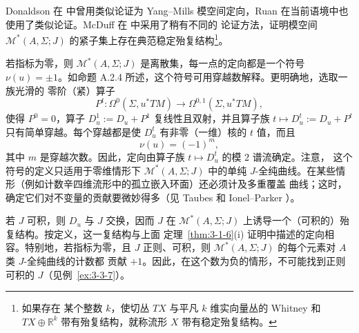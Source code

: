 \begin{remark}\label{rem:3-2-4}
Donaldson 在  中曾用类似论证为 Yang--Mills 模空间定向，Ruan
 在当前语境中也使用了类似论证。McDuff 在  中采用了稍有不同的
论证方法，证明模空间 $\mathcal M^*(A,\Sigma;J)$ 的紧子集上存在典范稳定殆复结构\footnote{如果存在
某个整数 $k$，使切丛 $TX$ 与平凡 $k$ 维实向量丛的 Whitney 和
$TX\oplus\mathbb R^k$ 带有殆复结构，就称流形 $X$ 带有稳定殆复结构。}。
\end{remark}

\begin{remark}\label{rem:3-2-5}
若指标为零，则 $\mathcal M^*(A,\Sigma;J)$ 是离散集，每一点的定向都是一个符号
$\nu(u)=\pm1$。如命题 A.2.4 所述，这个符号可用穿越数解释。更明确地，选取一族光滑的
零阶（紧）算子
\[
  P^t:\Omega^0(\Sigma,u^*TM)
  \longrightarrow\Omega^{0,1}(\Sigma,u^*TM),
\]
使得 $P^0=0$，算子 $D_u^1:=D_u+P^1$ 复线性且双射，并且算子族
$t\mapsto D_u^t:=D_u+P^t$ 只有简单穿越。每个穿越都是使 $D_u^t$ 有非零（一维）核的
$t$ 值，而且
\[
  \nu(u)=(-1)^m,
\]
其中 $m$ 是穿越次数。因此，定向由算子族 $t\mapsto D_u^t$ 的模 $2$ 谱流确定。注意，
这个符号的定义只适用于零维情形下 $\mathcal M^*(A,\Sigma;J)$ 中的单纯
$J$-全纯曲线。在某些情形（例如计数辛四维流形中的孤立嵌入环面）还必须计及多重覆盖
曲线；这时，确定它们对不变量的贡献要微妙得多（见 Taubes  和
Ionel--Parker ）。
\end{remark}

\begin{remark}\label{rem:3-2-6}
若 $J$ 可积，则 $D_u$ 与 $J$ 交换，因而 $J$ 在
$\mathcal M^*(A,\Sigma;J)$ 上诱导一个（可积的）殆复结构。按定义，这一复结构与上面
定理~\ref{thm:3-1-6}\textup{(i)} 证明中描述的定向相容。特别地，若指标为零，且 $J$
正则、可积，则 $\mathcal M^*(A,\Sigma;J)$ 的每个元素对 $A$ 类 $J$-全纯曲线的计数都
贡献 $+1$。因此，在这个数为负的情形，不可能找到正则可积的 $J$（见例~\ref{ex:3-3-7}）。
\end{remark}

